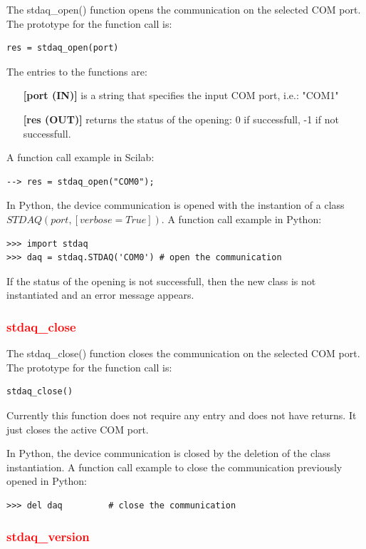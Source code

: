 \documentclass[letterpaper,10pt,english]{hitec}
\begin{document}
The stdaq\_open() function opens the communication on the selected COM port. \\
The prototype for the function call is:
\begin{verbatim}
res = stdaq_open(port)
\end{verbatim}
The entries to the functions are:
\begin{itemize}
\item [\textbf{[port (IN)]}] is a string that specifies the input COM port, i.e.: "COM1"
\item [\textbf{[res (OUT)]}] returns the status of the opening: 0 if successfull, -1 if not successfull.
\end{itemize}
A function call example in Scilab:
\begin{verbatim}
--> res = stdaq_open("COM0");
\end{verbatim}
%
In Python, the device communication is opened with the instantion of a class \\ $STDAQ(port,[verbose=True])$. A function call example in Python:
\begin{verbatim}
>>> import stdaq 
>>> daq = stdaq.STDAQ('COM0') # open the communication
\end{verbatim}
If the status of the opening is not successfull, then the new class is not instantiated and an error message appears.

\subsubsection{\textcolor{red}{stdaq\_close}}

The stdaq\_close() function closes the communication on the selected COM port. \\
The prototype for the function call is:
\begin{verbatim}
stdaq_close()
\end{verbatim}
Currently this function does not require any entry and does not have returns. It just closes the active COM port.

In Python, the device communication is closed by the deletion of the class instantiation. A function call example to close the communication previously opened in Python:
\begin{verbatim}
>>> del daq         # close the communication
\end{verbatim}

\subsubsection{\textcolor{red}{stdaq\_version}}
\end{document}
